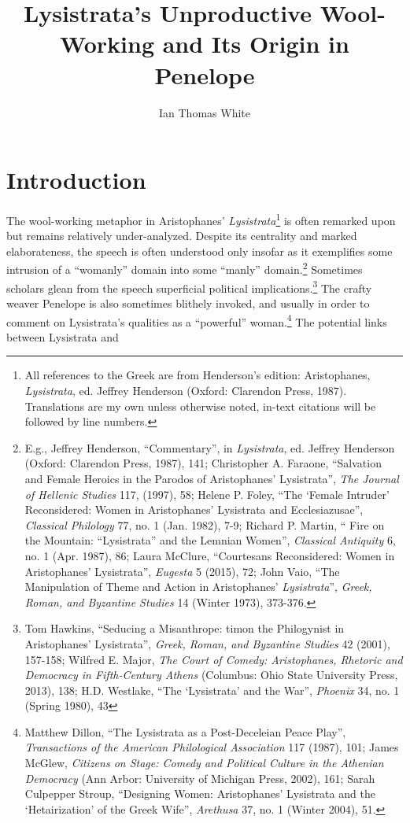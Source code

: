 \documentclass[12pt]{article}
\title{Lysistrata's Unproductive Wool-Working and Its Origin in Penelope}
\author{Ian Thomas White}
\date{}
\makeatletter
\renewcommand{\maketitle}
{
\begin{flushleft}
\textbf{{\large\@title}}
\newline
\@author
\end{flushleft}
}
\makeatother
\begin{document}
\thispagestyle{empty}

\begin{singlespacing}
\maketitle
\tableofcontents
\end{singlespacing}

\newpage

\section{Introduction}

The wool-working metaphor in Aristophanes' \textit{Lysistrata}\footnote{All references to the Greek are from Henderson's edition: Aristophanes, \textit{Lysistrata}, ed. Jeffrey Henderson (Oxford: Clarendon Press, 1987). Translations are my own unless otherwise noted, in-text citations will be followed by line numbers.} is often remarked upon but remains relatively under-analyzed. Despite its centrality and marked elaborateness, the speech is often understood only insofar as it exemplifies some intrusion of a ``womanly'' domain into some ``manly'' domain.\footnote{E.g., Jeffrey Henderson, ``Commentary'', in \textit{Lysistrata}, ed. Jeffrey Henderson (Oxford: Clarendon Press, 1987), 141; Christopher A. Faraone, ``Salvation and Female Heroics in the Parodos of Aristophanes' Lysistrata'', \textit{The Journal of Hellenic Studies} 117, (1997), 58; Helene P. Foley, ``The `Female Intruder' Reconsidered: Women in Aristophanes' Lysistrata and Ecclesiazusae'', \textit{Classical Philology} 77, no. 1 (Jan. 1982), 7-9; Richard P. Martin, `` Fire on the Mountain: ``Lysistrata'' and the Lemnian Women'', \textit{Classical Antiquity} 6, no. 1 (Apr. 1987), 86; Laura McClure, ``Courtesans Reconsidered: Women in Aristophanes' Lysistrata'', \textit{Eugesta} 5 (2015), 72; John Vaio, ``The Manipulation of Theme and Action in Aristophanes' \textit{Lysistrata}'', \textit{Greek, Roman, and Byzantine Studies} 14 (Winter 1973), 373-376.} Sometimes scholars glean from the speech superficial political implications.\footnote{Tom Hawkins, ``Seducing a Misanthrope: timon the Philogynist in Aristophanes' Lysistrata'', \textit{Greek, Roman, and Byzantine Studies} 42 (2001), 157-158; Wilfred E. Major, \textit{The Court of Comedy: Aristophanes, Rhetoric and Democracy in Fifth-Century Athens} (Columbus: Ohio State University Press, 2013), 138; H.D. Westlake, ``The `Lysistrata' and the War'', \textit{Phoenix} 34, no. 1 (Spring 1980), 43} The crafty weaver Penelope is also sometimes blithely invoked, and usually in order to comment on Lysistrata's qualities as a ``powerful'' woman.\footnote{Matthew Dillon, ``The Lysistrata as a Post-Deceleian Peace Play'', \textit{Transactions of the American Philological Association} 117 (1987), 101; James McGlew, \textit{Citizens on Stage: Comedy and Political Culture in the Athenian Democracy} (Ann Arbor: University of Michigan Press, 2002), 161; Sarah Culpepper Stroup, ``Designing Women: Aristophanes' Lysistrata and the `Hetairization' of the Greek Wife'', \textit{Arethusa} 37, no. 1 (Winter 2004), 51.} The potential links between Lysistrata and 
\end{document}
